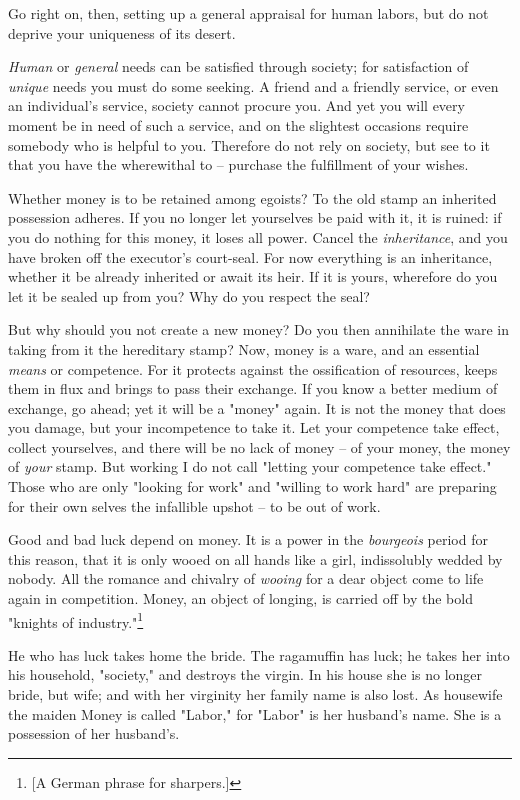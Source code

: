 \documentclass[a4paper]{book}
\begin{document}
Go right on, then, setting up a general appraisal for human labors, but do not 
deprive your uniqueness of its desert.

\textit{Human} or \textit{general} needs can be satisfied through society; for 
satisfaction of \textit{unique} needs you must do some seeking. A friend and a 
friendly service, or even an individual's service, society cannot procure you. 
And yet you will every moment be in need of such a service, and on the 
slightest occasions require somebody who is helpful to you. Therefore do not 
rely on society, but see to it that you have the wherewithal to -- purchase 
the fulfillment of your wishes.

Whether money is to be retained among egoists? To the old stamp an inherited 
possession adheres. If you no longer let yourselves be paid with it, it is 
ruined: if you do nothing for this money, it loses all power. Cancel the 
\textit{inheritance}, and you have broken off the executor's court-seal. For 
now everything is an inheritance, whether it be already inherited or await its 
heir. If it is yours, wherefore do you let it be sealed up from you? Why do 
you respect the seal?

But why should you not create a new money? Do you then annihilate the ware in 
taking from it the hereditary stamp? Now, money is a ware, and an essential 
\textit{means} or competence. For it protects against the ossification of 
resources, keeps them in flux and brings to pass their exchange. If you know a 
better medium of exchange, go ahead; yet it will be a "{}money"{} again. It is 
not the money that does you damage, but your incompetence to take it. Let your 
competence take effect, collect yourselves, and there will be no lack of money 
-- of your money, the money of \textit{your} stamp. But working I do not call 
"{}letting your competence take effect."{} Those who are only "{}looking for 
work"{} and "{}willing to work hard"{} are preparing for their own selves the 
infallible upshot -- to be out of work.

Good and bad luck depend on money. It is a power in the \textit{bourgeois} 
period for this reason, that it is only wooed on all hands like a girl, 
indissolubly wedded by nobody. All the romance and chivalry of \textit{wooing} 
for a dear object come to life again in competition. Money, an object of 
longing, is carried off by the bold "{}knights of industry."{}\footnote{[A 
German phrase for sharpers.]}

He who has luck takes home the bride. The ragamuffin has luck; he takes her 
into his household, "{}society,"{} and destroys the virgin. In his house she 
is no longer bride, but wife; and with her virginity her family name is also 
lost. As housewife the maiden Money is called "{}Labor,"{} for "{}Labor"{} is 
her husband's name. She is a possession of her husband's.
\end{document}
